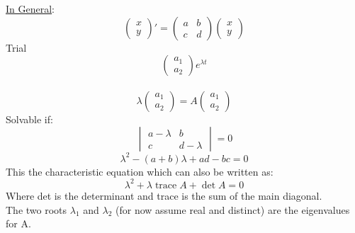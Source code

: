 \documentclass[12pt]{article}
\numberwithin{equation}{subsection}
\newcommand{\inda}{\hspace{.5cm}}
\DeclareMathOperator{\trace}{trace}
\begin{document}
\newpage
\noindent \underline{In General}:
\begin{equation}
\begin{pmatrix}
x \\
y
\end{pmatrix}'=\begin{pmatrix}
a & b \\
c & d
\end{pmatrix} \begin{pmatrix}
x \\
y
\end{pmatrix}
\end{equation}
\inda Trial
\begin{equation}
\begin{pmatrix}
a_1 \\
a_2
\end{pmatrix}e^{\lambda t} 
\end{equation}\\
\begin{equation}
\lambda \begin{pmatrix}
a_1 \\
a_2
\end{pmatrix}= A \begin{pmatrix}
a_1 \\
a_2
\end{pmatrix}
\end{equation}
\inda Solvable if:
\begin{equation}
\begin{vmatrix}
a-\lambda & b \\
c & d-\lambda
\end{vmatrix} =0
\end{equation}
\begin{equation}
\lambda^2-(a+b)\lambda +ad-bc=0
\end{equation}
\inda This the characteristic equation which can also be written as:
\begin{equation}
\lambda^2+ \lambda \trace A  +\det A =0
\end{equation}
\inda Where det is the determinant and trace is the sum of the main diagonal.\\

The two roots $\lambda_1 $ and $\lambda_2 $ (for now assume real and distinct) are the eigenvalues for A.\\
\end{document}
